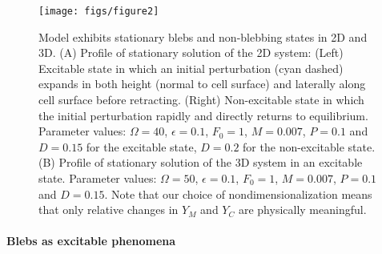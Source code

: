\begin{figure}
\captionsetup{width=17cm}
	\texttt{[image: figs/figure2]}
      \caption{Model exhibits stationary blebs and non-blebbing states in 2D and 3D. (A) Profile of stationary solution of the 2D system: (Left) Excitable state in which an initial perturbation (cyan dashed) expands in both height (normal to cell surface) and laterally along cell surface before retracting. (Right) Non-excitable state in which the initial perturbation rapidly and directly returns to equilibrium. Parameter values: $\Omega = 40$, $\epsilon = 0.1$, $F_0 = 1$, $M = 0.007$, $P = 0.1$ and $D = 0.15$ for the excitable state, $D = 0.2$ for the non-excitable state. (B) Profile of stationary solution  of the 3D system in an excitable state. Parameter values: $\Omega = 50$, $\epsilon = 0.1$, $F_0 = 1$, $M = 0.007$, $P = 0.1$ and $D = 0.15$. Note that our choice of nondimensionalization means that only relative changes in $Y_M$ and $Y_C$ are physically meaningful.}
      \label{fig::stationary}
\end{figure}





\paragraph{Blebs as excitable phenomena}

